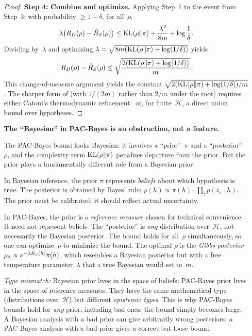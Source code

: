 \begin{proof}
\textbf{Step 4: Combine and optimize.}
Applying Step~1 to the event from Step~3: with probability
$\geq 1 - \delta$, for all~$\rho$,
\[
  \lambda\bigl(R_D(\rho) - \hat{R}_S(\rho)\bigr)
  \leq \mathrm{KL}(\rho \| \pi) + \frac{\lambda^2}{8m} + \log\frac{1}{\delta}.
\]
Dividing by~$\lambda$ and optimizing
$\lambda = \sqrt{8m(\mathrm{KL}(\rho\|\pi) + \log(1/\delta))}$ yields
\[
  R_D(\rho) - \hat{R}_S(\rho)
  \leq \sqrt{\frac{2(\mathrm{KL}(\rho \| \pi) + \log(1/\delta))}{m}}.
\]
This change-of-measure argument yields the constant
$\sqrt{2(\mathrm{KL}(\rho\|\pi) + \log(1/\delta))/m}$.  The sharper form of
 (with $1/(2m)$ rather than $2/m$ under the root) requires
either Catoni's thermodynamic refinement~\cite{Catoni2007} or, for
finite~$\mathcal{H}$, a direct union bound over hypotheses.
\end{proof}


\begin{obstbox}
\textbf{The ``Bayesian'' in PAC-Bayes is an obstruction, not a
feature.}

The PAC-Bayes bound looks Bayesian: it involves a ``prior''~$\pi$
and a ``posterior''~$\rho$, and the complexity term $\mathrm{KL}(\rho\|\pi)$
penalizes departure from the prior.  But the prior plays a
fundamentally different role from a Bayesian prior.

In Bayesian inference, the prior $\pi$ represents \emph{beliefs}
about which hypothesis is true.  The posterior is obtained by Bayes'
rule: $\rho(h) \propto \pi(h) \cdot \prod_i p(z_i \mid h)$.  The
prior must be calibrated: it should reflect actual uncertainty.

In PAC-Bayes, the prior is a \emph{reference measure} chosen for
technical convenience.  It need not represent beliefs.  The ``posterior''
is \emph{any} distribution over~$\mathcal{H}$, not necessarily the
Bayesian posterior.  The bound holds for all~$\rho$ simultaneously,
so one can optimize~$\rho$ to minimize the bound.  The optimal
$\rho$ is the \emph{Gibbs posterior}
$\rho_\lambda \propto e^{-\lambda \hat{R}_S(h)} \pi(h)$, which
resembles a Bayesian posterior but with a free temperature
parameter~$\lambda$ that a true Bayesian would set to~$m$.

\emph{Type mismatch:} Bayesian prior lives in the space of beliefs;
PAC-Bayes prior lives in the space of reference measures.  They have
the same mathematical type (distributions over~$\mathcal{H}$) but
different \emph{epistemic types}.  This is why PAC-Bayes bounds hold
for \emph{any} prior, including bad ones; the bound simply becomes
large.  A Bayesian analysis with a bad prior can give arbitrarily
wrong posteriors; a PAC-Bayes analysis with a bad prior gives a
correct but loose bound.
\end{obstbox}



